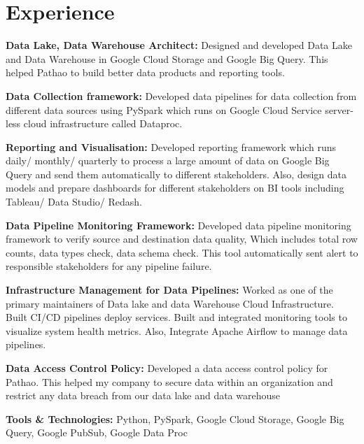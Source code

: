 \documentclass[letterpaper]{deedy-resume} %
\begin{document}
\begin{minipage}[t]{0.66\textwidth} %


\section{Experience}


\vspace{\topsep} %
\begin{tightitemize}
\sectionspace
\item \textbf{Data Lake, Data Warehouse Architect:}
Designed and developed Data Lake and Data Warehouse in Google Cloud Storage and Google Big Query. This helped Pathao to build better data products and reporting tools.
\item \textbf{Data Collection framework:}
Developed data pipelines for data collection from different data sources using PySpark which runs on Google Cloud Service server-less cloud infrastructure called Dataproc.
\item \textbf{Reporting and Visualisation:}
Developed reporting framework which runs daily/ monthly/ quarterly to process a large amount of data on Google Big Query and send them automatically to different stakeholders. Also, design data models and prepare dashboards for different stakeholders on BI tools including Tableau/ Data Studio/ Redash.
\item \textbf{Data Pipeline Monitoring Framework:}
Developed data pipeline monitoring framework to verify source and destination data quality, Which includes total row counts, data types check, data schema check. This tool automatically sent alert to responsible stakeholders for any pipeline failure.
\item \textbf{Infrastructure Management for Data Pipelines:}
Worked as one of the primary maintainers of Data lake and data Warehouse Cloud Infrastructure. Built CI/CD pipelines deploy services. Built and integrated monitoring tools to visualize system health metrics. Also, Integrate Apache Airflow to manage data pipelines.
\item \textbf{Data Access Control Policy:}
Developed a data access control policy for Pathao. This helped my company to secure data within an organization and restrict any data breach from our data lake and data warehouse
\item \textbf{Tools & Technologies:} Python, PySpark, Google Cloud Storage, Google Big Query, Google PubSub, Google Data Proc
\end{tightitemize}


\end{minipage}
\end{document}
